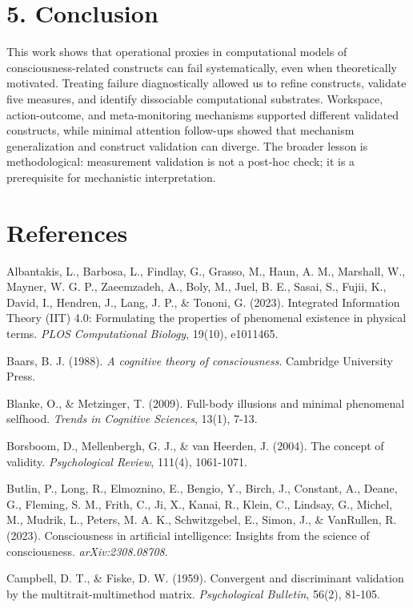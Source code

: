\documentclass[
  11pt,
  letterpaper,
]{article}
\begin{document}
\section{5. Conclusion}\label{conclusion}

This work shows that operational proxies in computational models of
consciousness-related constructs can fail systematically, even when
theoretically motivated. Treating failure diagnostically allowed us to
refine constructs, validate five measures, and identify dissociable
computational substrates. Workspace, action-outcome, and meta-monitoring
mechanisms supported different validated constructs, while minimal
attention follow-ups showed that mechanism generalization and construct
validation can diverge. The broader lesson is methodological:
measurement validation is not a post-hoc check; it is a prerequisite for
mechanistic interpretation.

\section{References}\label{references}

Albantakis, L., Barbosa, L., Findlay, G., Grasso, M., Haun, A. M.,
Marshall, W., Mayner, W. G. P., Zaeemzadeh, A., Boly, M., Juel, B. E.,
Sasai, S., Fujii, K., David, I., Hendren, J., Lang, J. P., \& Tononi, G.
(2023). Integrated Information Theory (IIT) 4.0: Formulating the
properties of phenomenal existence in physical terms. \emph{PLOS
Computational Biology}, 19(10), e1011465.

Baars, B. J. (1988). \emph{A cognitive theory of consciousness}.
Cambridge University Press.

Blanke, O., \& Metzinger, T. (2009). Full-body illusions and minimal
phenomenal selfhood. \emph{Trends in Cognitive Sciences}, 13(1), 7-13.

Borsboom, D., Mellenbergh, G. J., \& van Heerden, J. (2004). The concept
of validity. \emph{Psychological Review}, 111(4), 1061-1071.

Butlin, P., Long, R., Elmoznino, E., Bengio, Y., Birch, J., Constant,
A., Deane, G., Fleming, S. M., Frith, C., Ji, X., Kanai, R., Klein, C.,
Lindsay, G., Michel, M., Mudrik, L., Peters, M. A. K., Schwitzgebel, E.,
Simon, J., \& VanRullen, R. (2023). Consciousness in artificial
intelligence: Insights from the science of consciousness.
\emph{arXiv:2308.08708}.

Campbell, D. T., \& Fiske, D. W. (1959). Convergent and discriminant
validation by the multitrait-multimethod matrix. \emph{Psychological
Bulletin}, 56(2), 81-105.
\end{document}
